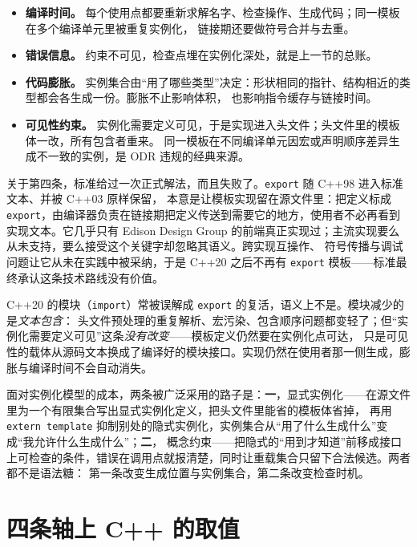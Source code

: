 \documentclass[12pt,a4paper,fontset=fandol]{ctexbook}
\newcommand{\cpp}[1]{C++#1}
\newcommand{\kw}[1]{\texttt{#1}}
\begin{document}
\begin{itemize}
  \item \textbf{编译时间。} 每个使用点都要重新求解名字、检查操作、生成代码；同一模板在多个编译单元里被重复实例化，
链接期还要做符号合并与去重。
  \item \textbf{错误信息。} 约束不可见，检查点埋在实例化深处，就是上一节的总账。
  \item \textbf{代码膨胀。} 实例集合由“用了哪些类型”决定：形状相同的指针、结构相近的类型都会各生成一份。膨胀不止影响体积，
也影响指令缓存与链接时间。
  \item \textbf{可见性约束。} 实例化需要定义可见，于是实现进入头文件；头文件里的模板体一改，所有包含者重来。
同一模板在不同编译单元因宏或声明顺序差异生成不一致的实例，是 ODR 违规的经典来源。
\end{itemize}

关于第四条，标准给过一次正式解法，而且失败了。\kw{export} 随 \cpp{98} 进入标准文本、并被 \cpp{03} 原样保留，
本意是让模板实现留在源文件里：把定义标成 \kw{export}，由编译器负责在链接期把定义传送到需要它的地方，使用者不必再看到实现文本。它几乎只有
Edison Design Group 的前端真正实现过；主流实现要么从未支持，要么接受这个关键字却忽略其语义。跨实现互操作、
符号传播与调试问题让它从未在实践中被采纳，于是 \cpp{20} 之后不再有 \kw{export} 模板——标准最终承认这条技术路线没有价值。

\cpp{20} 的模块（\kw{import}）常被误解成 \kw{export} 的复活，语义上不是。模块减少的是\emph{文本包含}：
头文件预处理的重复解析、宏污染、包含顺序问题都变轻了；但“实例化需要定义可见”这条\emph{没有改变}——模板定义仍然要在实例化点可达，
只是可见性的载体从源码文本换成了编译好的模块接口。实现仍然在使用者那一侧生成，膨胀与编译时间不会自动消失。

\begin{bestpractice}[title={本册第六部分的两条现实出路}]
面对实例化模型的成本，两条被广泛采用的路子是：\textbf{一}，显式实例化——在源文件里为一个有限集合写出显式实例化定义，把头文件里能省的模板体省掉，
再用 \kw{extern template} 抑制别处的隐式实例化，实例集合从“用了什么生成什么”变成“我允许什么生成什么”；\textbf{二}，
概念约束——把隐式的“用到才知道”前移成接口上可检查的条件，错误在调用点就报清楚，同时让重载集合只留下合法候选。两者都不是语法糖：
第一条改变生成位置与实例集合，第二条改变检查时机。
\end{bestpractice}

\section{四条轴上 \cpp{} 的取值}
\end{document}
